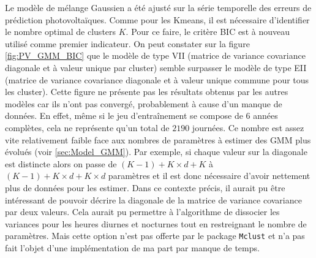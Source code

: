 \documentclass[12pt]{report}
\begin{document}
Le modèle de mélange Gaussien a été ajusté sur la série temporelle des erreurs de prédiction photovoltaïques. Comme pour les Kmeans, il est nécessaire d'identifier le nombre optimal de clusters $K$. Pour ce faire, le critère BIC est à nouveau utilisé comme premier indicateur. On peut constater sur la figure \ref{fig:PV_GMM_BIC} que le modèle de type VII (matrice de variance covariance diagonale et à valeur unique par cluster) semble surpasser le modèle de type EII (matrice de variance covariance diagonale et à valeur unique commune pour tous les cluster). Cette figure ne présente pas les résultats obtenus par les autres modèles car ils n'ont pas convergé, probablement à cause d'un manque de données. En effet, même si le jeu d'entraînement se compose de 6 années complètes, cela ne représente qu'un total de $2190$ journées. Ce nombre est assez vite relativement faible face aux nombres de paramètres à estimer des GMM plus évolués (voir \ref{sec:Model_GMM}). Par exemple, si chaque valeur sur la diagonale est distincte alors on passe de $(K-1) + K\times d + K$ à $(K-1) + K\times d + K \times d$ paramètres et il est donc nécessaire d'avoir nettement plus de données pour les estimer. Dans ce contexte précis, il aurait pu être intéressant de pouvoir décrire la diagonale de la matrice de variance covariance par deux valeurs. Cela aurait pu permettre à l'algorithme de dissocier les variances pour les heures diurnes et nocturnes tout en restreignant le nombre de paramètres. Mais cette option n'est pas offerte par le package \texttt{Mclust} et n'a pas fait l'objet d'une implémentation de ma part par manque de temps.
\end{document}

